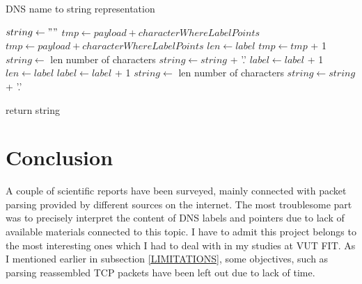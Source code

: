 \documentclass[11pt,a4paper]{article}
\begin{document}
\label{DNSNameToString}
\begin{algorithm}
    \caption{DNS name to string representation}
    \begin{algorithmic}

        \State $ string \gets "" $
                \State $ tmp \gets payload+characterWhereLabelPoints $
                        \State $ tmp \gets payload+characterWhereLabelPoints $
                    \EndIf
                    \State $ len \gets label $
                    \State $ tmp \gets tmp $ + 1
                    \State $ string \gets $ len number of characters
                    \State $ string \gets string$ + '.'
                \EndWhile
                \State $ label \gets label $ + 1
            \Else
                \State $ len \gets label $
                \State $ label \gets label $ + 1
                \State $ string \gets $ len number of characters
                \State $ string \gets string$ + '.'
            \EndIf

        \EndWhile
        \State return string
    \EndProcedure
    \end{algorithmic}
\end{algorithm}

\newpage


\section{Conclusion}

A couple of scientific reports have been surveyed, mainly connected with packet parsing provided by different sources on the internet. The most troublesome part was to precisely interpret the content of DNS labels and pointers due to lack of available materials connected to this topic. I have to admit this project belongs to the most interesting ones which I had to deal with in my studies at VUT FIT. As I mentioned earlier in subsection \ref{LIMITATIONS}, some objectives, such as parsing reassembled TCP packets have been left out due to lack of time.

\newpage %

\makeatletter
\makeatother

\begin{flushleft}
    
\end{flushleft}


\end{document}
